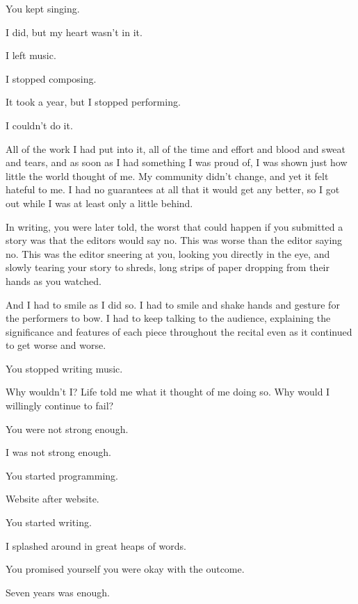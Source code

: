 \begin{paracol}{2}
\begin{leftcolumn}
\begin{ally}
You kept singing.
\end{ally}
I did, but my heart wasn't in it.

I left music.

I stopped composing.

It took a year, but I stopped performing.

I couldn't do it.

All of the work I had put into it, all of the time and effort and blood and sweat and tears, and as soon as I had something I was proud of, I was shown just how little the world thought of me. My community didn't change, and yet it felt hateful to me. I had no guarantees at all that it would get any better, so I got out while I was at least only a little behind.

\begin{ally}
In writing, you were later told, the worst that could happen if you submitted a story was that the editors would say no. This was worse than the editor saying no. This was the editor sneering at you, looking you directly in the eye, and slowly tearing your story to shreds, long strips of paper dropping from their hands as you watched.
\end{ally}
And I had to smile as I did so. I had to smile and shake hands and gesture for the performers to bow. I had to keep talking to the audience, explaining the significance and features of each piece throughout the recital even as it continued to get worse and worse.

\begin{ally}
You stopped writing music.
\end{ally}
Why wouldn't I? Life told me what it thought of me doing so. Why would I willingly continue to fail?

\begin{ally}
You were not strong enough.
\end{ally}
I was not strong enough.

\begin{ally}
You started programming.
\end{ally}
Website after website.

\begin{ally}
You started writing.
\end{ally}
I splashed around in great heaps of words.

\begin{ally}
You promised yourself you were okay with the outcome.
\end{ally}
Seven years was enough.


\end{leftcolumn}
\end{paracol}

